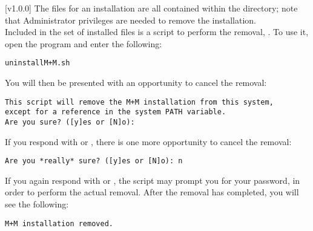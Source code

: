 [v1.0.0]
The files for an \mplusm{} installation are all contained within the
 directory; note that Administrator privileges are needed to remove the
installation.\\

Included in the set of installed files is a script to perform the removal,
.
To use it, open the  program and enter the following:
\outputBegin
\begin{verbatim}
uninstallM+M.sh
\end{verbatim}
\outputEnd{}
You will then be presented with an opportunity to cancel the removal:
\outputBegin
\begin{verbatim}
This script will remove the M+M installation from this system,
except for a reference in the system PATH variable.
Are you sure? ([y]es or [N]o):
\end{verbatim}
\outputEnd{}
If you respond with  or , there is one more opportunity to cancel
the removal:
\outputBegin
\begin{verbatim}
Are you *really* sure? ([y]es or [N]o): n
\end{verbatim}
\outputEnd{}
If you again respond with  or , the script may prompt you for your
password, in order to perform the actual removal.
After the removal has completed, you will see the following:
\outputBegin
\begin{verbatim}
M+M installation removed.
\end{verbatim}
\outputEnd
\secondaryEnd
{}
\TBD
\secondaryEnd
{}
\TBD
\secondaryEnd
\primaryEnd{}
